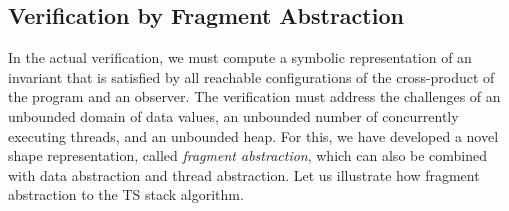

\subsection{Verification by Fragment Abstraction}

In the actual verification, we must compute a symbolic representation
of an invariant that is satisfied by all reachable configurations of
the cross-product of the program  and an observer.
The verification must address the challenges of an unbounded domain of
data values, an unbounded number of concurrently executing threads, and an
unbounded heap.
For this, we have developed a novel shape representation, called
{\em fragment abstraction}, which can also be combined with
data abstraction and thread abstraction.
Let us illustrate how fragment abstraction to the TS stack algorithm.

